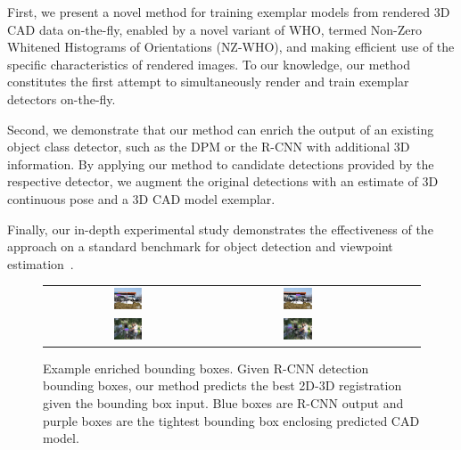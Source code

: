 \documentclass[extendedabs]{bmvc2k}
\begin{document}
First, we present a novel method for training exemplar models from
rendered 3D CAD data on-the-fly, enabled by a novel variant of
WHO, termed Non-Zero Whitened Histograms of Orientations (NZ-WHO), and making
efficient use of the specific characteristics of rendered images. To our
knowledge, our method constitutes the first attempt to simultaneously render
and train exemplar detectors on-the-fly.

Second, we demonstrate that our method can enrich the output of an existing
object class detector, such as the DPM or the
R-CNN with additional 3D information. By applying our
method to candidate detections provided by the respective detector, we augment the original detections with an estimate of 3D continuous pose and a 3D
CAD model exemplar.

Finally, our in-depth experimental study demonstrates
the effectiveness of the approach on a standard benchmark for
object detection and viewpoint estimation~\cite{Xiang14}.


\begin{figure}[t]
\small
\setlength\tabcolsep{1pt}
\centering
\begin{tabular}{ccccc}
  \includegraphics[width=0.18\textwidth]{car_cnn/2c.png} &
  \includegraphics[width=0.18\textwidth]{car_cnn/2e.png} \\
  \includegraphics[width=0.18\textwidth]{bicycle_cnn/4b.png} &
  \includegraphics[width=0.18\textwidth]{bicycle_cnn/4c.png} \\
\end{tabular}
\caption{Example enriched bounding boxes. Given R-CNN
	detection bounding boxes, our method predicts the best 2D-3D
	registration given the bounding box input. Blue boxes are R-CNN output and
	purple boxes are the tightest bounding box enclosing predicted CAD model.}
\label{fig:pascal12cnn}
\end{figure}
\end{document}
